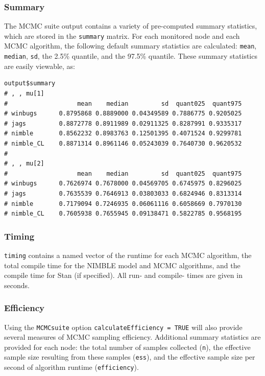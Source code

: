\documentclass[12pt,oneside]{book}\usepackage[]{graphicx}\usepackage[]{color}
\def\cd#1{\texttt{#1}}
\begin{document}
\subsubsection{Summary}

The MCMC suite output contains a variety of pre-computed summary statistics, which are stored in the \cd{summary} matrix.  For each monitored node and each MCMC algorithm, the following default summary statistics are calculated: \cd{mean}, \cd{median}, \cd{sd}, the 2.5\% quantile, and the 97.5\% quantile.  These summary statistics are easily viewable, as:

\begin{verbatim}
output$summary
# , , mu[1]
#                   mean    median         sd  quant025  quant975
# winbugs      0.8795868 0.8889000 0.04349589 0.7886775 0.9205025
# jags         0.8872778 0.8911989 0.02911325 0.8287991 0.9335317
# nimble       0.8562232 0.8983763 0.12501395 0.4071524 0.9299781
# nimble_CL    0.8871314 0.8961146 0.05243039 0.7640730 0.9620532
# 
# , , mu[2]
#                   mean    median         sd  quant025  quant975
# winbugs      0.7626974 0.7678000 0.04569705 0.6745975 0.8296025
# jags         0.7635539 0.7646913 0.03803033 0.6824946 0.8313314
# nimble       0.7179094 0.7246935 0.06061116 0.6058669 0.7970130
# nimble_CL    0.7605938 0.7655945 0.09138471 0.5822785 0.9568195
\end{verbatim}

\subsubsection{Timing}

\cd{timing} contains a named vector of the runtime for each MCMC algorithm, the total compile time for the NIMBLE model and MCMC algorithms, and the compile time for Stan (if specified).  All run- and compile- times are given in seconds.

\subsubsection{Efficiency}

Using the \cd{MCMCsuite} option \cd{calculateEfficiency = TRUE} will also provide several measures of MCMC sampling efficiency.  Additional summary statistics are provided for each node: the total number of samples collected (\cd{n}), the effective sample size resulting from these samples (\cd{ess}), and the effective sample size per second of algorithm runtime (\cd{efficiency}).
\end{document}
